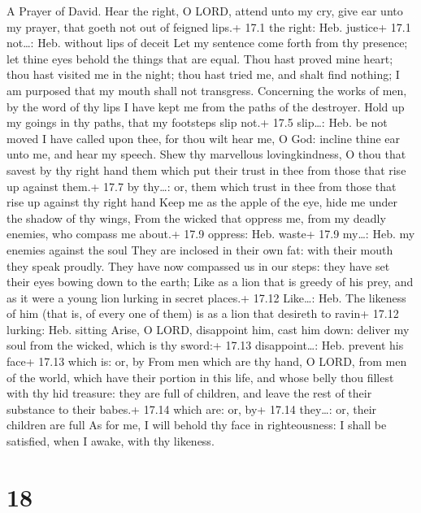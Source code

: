 A Prayer of David.  Hear the right, O LORD, attend unto my
cry, give ear unto my prayer, that goeth not out of feigned lips.+ 17.1
the right: Heb. justice+ 17.1 not\ldots: Heb. without lips of deceit
 Let my sentence come forth from thy presence; let thine
eyes behold the things that are equal.  Thou hast proved
mine heart; thou hast visited me in the night; thou hast tried me, and
shalt find nothing; I am purposed that my mouth shall not transgress.
 Concerning the works of men, by the word of thy lips I have
kept me from the paths of the destroyer.  Hold up my goings
in thy paths, that my footsteps slip not.+ 17.5 slip\ldots: Heb. be not
moved  I have called upon thee, for thou wilt hear me, O
God: incline thine ear unto me, and hear my speech.  Shew
thy marvellous lovingkindness, O thou that savest by thy right hand them
which put their trust in thee from those that rise up against them.+
17.7 by thy\ldots: or, them which trust in thee from those that rise up
against thy right hand  Keep me as the apple of the eye,
hide me under the shadow of thy wings,  From the wicked that
oppress me, from my deadly enemies, who compass me about.+ 17.9 oppress:
Heb. waste+ 17.9 my\ldots: Heb. my enemies against the soul
 They are inclosed in their own fat: with their mouth they
speak proudly.  They have now compassed us in our steps:
they have set their eyes bowing down to the earth;  Like as
a lion that is greedy of his prey, and as it were a young lion lurking
in secret places.+ 17.12 Like\ldots: Heb. The likeness of him (that is,
of every one of them) is as a lion that desireth to ravin+ 17.12
lurking: Heb. sitting  Arise, O LORD, disappoint him, cast
him down: deliver my soul from the wicked, which is thy sword:+ 17.13
disappoint\ldots: Heb. prevent his face+ 17.13 which is: or, by
 From men which are thy hand, O LORD, from men of the
world, which have their portion in this life, and whose belly thou
fillest with thy hid treasure: they are full of children, and leave the
rest of their substance to their babes.+ 17.14 which are: or, by+ 17.14
they\ldots: or, their children are full  As for me, I will
behold thy face in righteousness: I shall be satisfied, when I awake,
with thy likeness.

\hypertarget{section-17}{%
\section{18}\label{section-17}}


